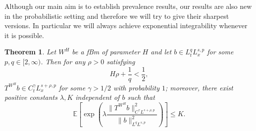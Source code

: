 \documentclass[10pt]{article}
\newtheorem{theorem}{Theorem}
\begin{document}
Although our main aim is to establish prevalence results, our results are also
new in the probabilistic setting and therefore we will try to give their
sharpest versions. In particular we will always achieve exponential
integrability whenever it is possible.

\begin{theorem}
  \label{sec3.3 thm averaging bessel}Let $W^H$ be a fBm of parameter $H$ and
  let $b \in L^q_t L^{s, p}_x$ for some $p, q \in [2, \infty)$. Then for any
  $\rho > 0$ satisfying
  \begin{equation}
    H \rho + \frac{1}{q} < \frac{1}{2}, \label{sec3.3 KR condition}
  \end{equation}
  $T^{W^H} b \in C_t^{\gamma} L_x^{s + \rho, p}$ for some $\gamma > 1 / 2$
  with probability $1$; moreover, there exist positive constants $\lambda, K$
  independent of $b$ such that
  \begin{equation}
    \mathbb{E} \left[ \exp \left( \lambda \frac{\| T^{W^H} b \|^2_{C^{\gamma}
    L^{s + \rho, p}}}{\| b \|_{L^q L^{s, p}}^2} \right) \right] \leqslant K.
    \label{sec3.3 thm exp integrability bessel}
  \end{equation}
\end{theorem}
\end{document}
